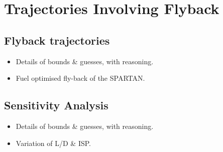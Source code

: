 
\cleardoublepage
\chapter{Trajectories Involving Flyback}\label{chapter:numerical}


\section{Flyback trajectories }

\begin{itemize}
	\item Details of bounds \& guesses, with reasoning. 
	\item Fuel optimised fly-back of the SPARTAN. 
\end{itemize}

\section{Sensitivity Analysis}

\begin{itemize}
	\item Details of bounds \& guesses, with reasoning. 
	\item Variation of L/D \& ISP.
\end{itemize}